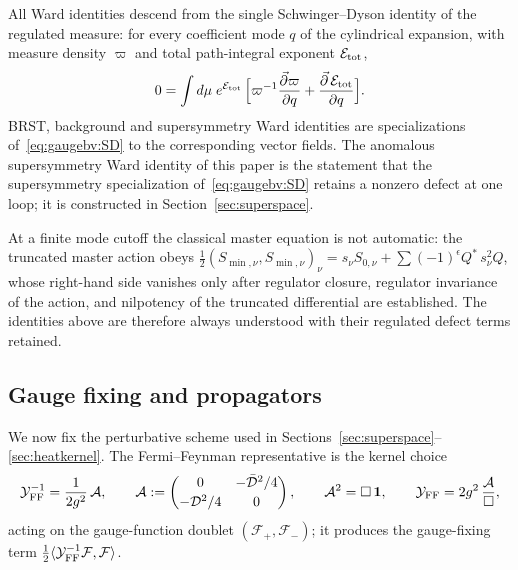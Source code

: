 All Ward identities descend from the single Schwinger--Dyson identity of the regulated measure: for every coefficient mode $q$ of the cylindrical expansion, with measure density $\varpi$ and total path-integral exponent $\mathcal E_{\rm tot}$,
\begin{equation}\label{eq:gaugebv:SD}
0=\int d\mu\;e^{\mathcal E_{\rm tot}}\,
\Bigl[\varpi^{-1}\frac{\vec\partial\varpi}{\partial q}+\frac{\vec\partial\,\mathcal E_{\rm tot}}{\partial q}\Bigr].
\end{equation}
BRST, background and supersymmetry Ward identities are specializations of~\eqref{eq:gaugebv:SD} to the corresponding vector fields. The anomalous supersymmetry Ward identity of this paper is the statement that the supersymmetry specialization of~\eqref{eq:gaugebv:SD} retains a nonzero defect at one loop; it is constructed in Section~\ref{sec:superspace}.

\begin{remark}\label{rem:gaugebv:cutoffdefect}
At a finite mode cutoff the classical master equation is not automatic: the truncated master action obeys $\tfrac12(S_{\min,\nu},S_{\min,\nu})_\nu=s_\nu S_{0,\nu}+\sum(-1)^{\epsilon}Q^*\,s_\nu^2Q$, whose right-hand side vanishes only after regulator closure, regulator invariance of the action, and nilpotency of the truncated differential are established. The identities above are therefore always understood with their regulated defect terms retained.
\end{remark}

\subsection{Gauge fixing and propagators}\label{sec:gaugebv:ff}

We now fix the perturbative scheme used in Sections~\ref{sec:superspace}--\ref{sec:heatkernel}. The Fermi--Feynman representative is the kernel choice
\begin{equation}\label{eq:gaugebv:YFF}
\mathcal Y_{\rm FF}^{-1}=\frac1{2g^2}\,\mathcal A,\qquad
\mathcal A:=\begin{pmatrix}0&-\bar{\mathcal{D}}^2/4\\[2pt]-\mathcal{D}^2/4&0\end{pmatrix},\qquad
\mathcal A^2=\Box\,\mathbf1,\qquad
\mathcal Y_{\rm FF}=2g^2\,\frac{\mathcal A}{\Box},
\end{equation}
acting on the gauge-function doublet $(\mathcal F_+,\mathcal F_-)$; it produces the gauge-fixing term $\tfrac12\langle\mathcal Y_{\rm FF}^{-1}\mathcal F,\mathcal F\rangle$.

